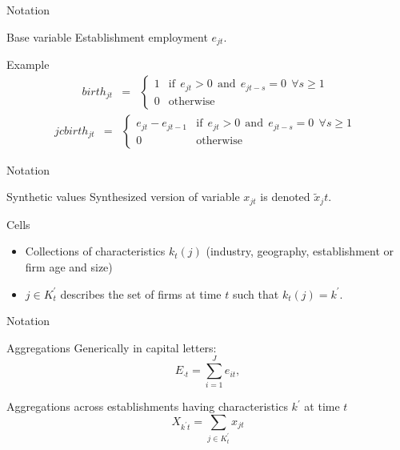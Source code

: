 \begin{frame}{Notation}

\begin{block}{Base variable}
Establishment employment $e_{jt}$. 
\end{block}
\begin{block}{Example}
\begin{eqnarray}
\label{eq:e_birth}
birth_{jt} &=& \left \lbrace 
\begin{array}{rl}
1 &\mbox{if}~~  e_{jt} > 0 ~~ \mbox{and}  ~~e_{jt-s} = 0 ~~\forall s\geq 1~~\\
0 &\mbox{otherwise}
\end{array} \right .
\end{eqnarray}
\begin{eqnarray}
\label{eq:e_birth2}
jcbirth_{jt} &=& \left \lbrace 
\begin{array}{rl}
e_{jt}-e_{jt-1} &\mbox{if}~~  e_{jt} > 0 ~~ \mbox{and}  ~~e_{jt-s} = 0 ~~\forall s\geq 1~~\\
0 &\mbox{otherwise}
\end{array} \right .
\end{eqnarray}
\end{block}
\end{frame}

\begin{frame}{Notation}
\begin{block}{Synthetic values}
Synthesized version of variable $x_{jt}$ is 
denoted $\tilde{x}_jt$. 
\end{block}
\begin{block}{Cells}
\begin{itemize}
\item[]
Collections of characteristics $k_t(j)$ (industry, geography, establishment or firm age and size)
\item[]  $j \in 
K_t^\prime$ describes the set of firms at time $t$ such that $k_t(j)=k^\prime$.  

\end{itemize}
\end{block}
\end{frame}

\begin{frame}{Notation}
\begin{block}{Aggregations}
Generically in capital letters:
\begin{equation}
\label{eq:national_e}
E_{\cdot t} = \sum_{i=1}^J e_{it},
\end{equation}

Aggregations across establishments having characteristics $k^\prime$ at 
time $t$
\begin{equation}
\label{eq:sum_X}
X_{k^\prime t} =  \sum_{j \in K_t^\prime} x_{jt}
\end{equation}
\end{block}
\end{frame}

